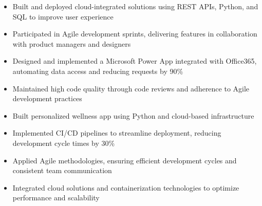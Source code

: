 \par\bigskip
{}
\par\smallskip
\begin{minipage}{13.75cm}
  \begin{minipage}{6.5cm}
    \begin{itemize}
      \item Built and deployed cloud-integrated solutions using REST APIs, Python, and SQL to improve user experience
      \item Participated in Agile development sprints, delivering features in collaboration with product managers and designers
    \end{itemize}
  \end{minipage}
  \hfill
  \begin{minipage}{6.5cm}
    \begin{itemize}
      \item Designed and implemented a Microsoft Power App integrated with Office365, automating data access and reducing requests by 90\%
      \item Maintained high code quality through code reviews and adherence to Agile development practices
    \end{itemize}
  \end{minipage}
\end{minipage}
\par\smallskip
\divider

\par\smallskip
\begin{minipage}{13.75cm}
  \begin{minipage}{6.5cm}
    \begin{itemize}
      \item Built personalized wellness app using Python and cloud-based infrastructure
      \item Implemented CI/CD pipelines to streamline deployment, reducing development cycle times by 30\%
    \end{itemize}
  \end{minipage}
  \hfill
  \begin{minipage}{6.5cm}
    \begin{itemize}
      \item Applied Agile methodologies, ensuring efficient development cycles and consistent team communication
      \item Integrated cloud solutions and containerization technologies to optimize performance and scalability
    \end{itemize}
  \end{minipage}
\end{minipage}
\par\smallskip
\divider

